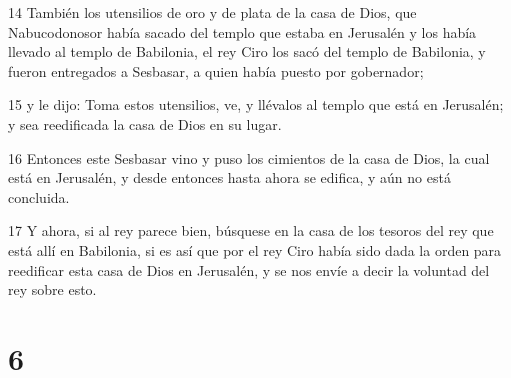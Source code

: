 \par 14 También los utensilios de oro y de plata de la casa de Dios, que Nabucodonosor había sacado del templo que estaba en Jerusalén y los había llevado al templo de Babilonia, el rey Ciro los sacó del templo de Babilonia, y fueron entregados a Sesbasar, a quien había puesto por gobernador;
\par 15 y le dijo: Toma estos utensilios, ve, y llévalos al templo que está en Jerusalén; y sea reedificada la casa de Dios en su lugar.
\par 16 Entonces este Sesbasar vino y puso los cimientos de la casa de Dios, la cual está en Jerusalén, y desde entonces hasta ahora se edifica, y aún no está concluida.
\par 17 Y ahora, si al rey parece bien, búsquese en la casa de los tesoros del rey que está allí en Babilonia, si es así que por el rey Ciro había sido dada la orden para reedificar esta casa de Dios en Jerusalén, y se nos envíe a decir la voluntad del rey sobre esto.

\chapter{6}

